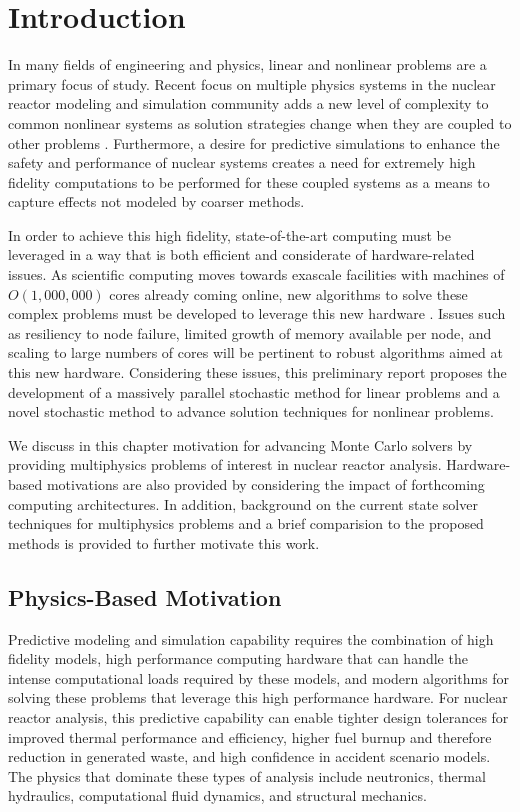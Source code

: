 \chapter{Introduction}
\label{ch:introduction}
In many fields of engineering and physics, linear and nonlinear
problems are a primary focus of study. Recent focus on multiple
physics systems in the nuclear reactor modeling and simulation
community adds a new level of complexity to common nonlinear systems
as solution strategies change when they are coupled to other problems
\citep{u.s._department_of_energy_casl_2011}. Furthermore, a desire
for predictive simulations to enhance the safety and performance of
nuclear systems creates a need for extremely high fidelity
computations to be performed for these coupled systems as a means to
capture effects not modeled by coarser methods.

In order to achieve this high fidelity, state-of-the-art computing
 must be leveraged in a way that is both efficient
and considerate of hardware-related issues. As scientific computing
moves towards exascale facilities with machines of $O(1,000,000)$
cores already coming online, new algorithms to solve these complex
problems must be developed to leverage this new hardware
\citep{kogge_using_2011}. Issues such as resiliency to node failure,
limited growth of memory available per node, and scaling to large
numbers of cores will be pertinent to robust algorithms aimed at this
new hardware. Considering these issues, this preliminary report
proposes the development of a massively parallel stochastic method for
linear problems and a novel stochastic method to advance solution
techniques for nonlinear problems.

We discuss in this chapter motivation for advancing Monte Carlo
solvers by providing multiphysics problems of interest in nuclear
reactor analysis. Hardware-based motivations are also provided by
considering the impact of forthcoming computing architectures. In
addition, background on the current state solver techniques for
multiphysics problems and a brief comparision to the proposed methods
is provided to further motivate this work. 

\section{Physics-Based Motivation}
\label{sec:physics_motivation}
Predictive modeling and simulation capability requires the combination
of high fidelity models, high performance computing hardware that can
handle the intense computational loads required by these models, and
modern algorithms for solving these problems that leverage this high
performance hardware. For nuclear reactor analysis, this predictive
capability can enable tighter design tolerances for improved thermal
performance and efficiency, higher fuel burnup and therefore reduction
in generated waste, and high confidence in accident scenario
models. The physics that dominate these types of analysis include
neutronics, thermal hydraulics, computational fluid dynamics, and
structural mechanics.


